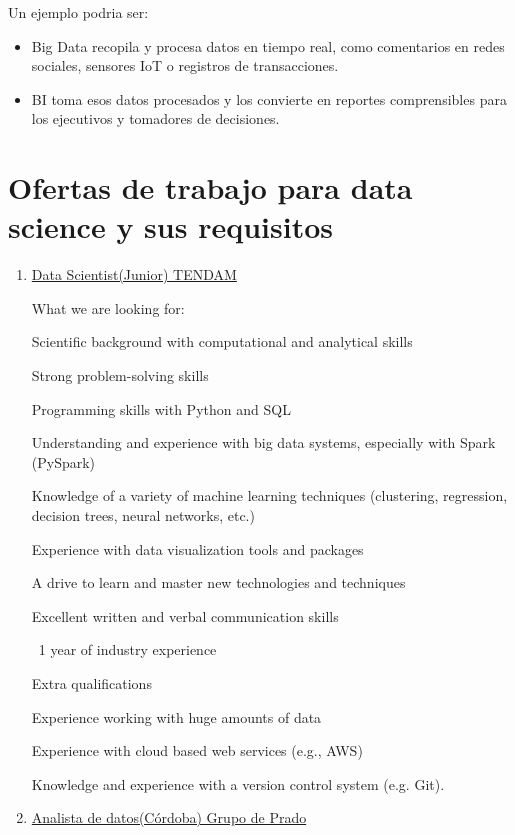 \documentclass[12pt]{article}
\begin{document}
Un ejemplo podria ser:

\begin{itemize}
    \item Big Data recopila y procesa datos en tiempo real, como comentarios en redes sociales, 
    sensores IoT o registros de transacciones.
    \item BI toma esos datos procesados y los convierte en reportes comprensibles para los ejecutivos y tomadores de decisiones.
\end{itemize}

\section{Ofertas de trabajo para data science y sus requisitos}

\begin{enumerate}
    \item \href{https://www.linkedin.com/jobs/view/4160806767}{Data Scientist(Junior) TENDAM}

    What we are looking for:

    Scientific background with computational and analytical skills

    Strong problem-solving skills

    Programming skills with Python and SQL

    Understanding and experience with big data systems, especially with Spark (PySpark)

    Knowledge of a variety of machine learning techniques (clustering, regression, decision trees, neural networks, etc.)

    Experience with data visualization tools and packages

    A drive to learn and master new technologies and techniques

    Excellent written and verbal communication skills

    ~1 year of industry experience

    Extra qualifications

    Experience working with huge amounts of data

    Experience with cloud based web services (e.g., AWS)

    Knowledge and experience with a version control system (e.g. Git).

    \item \href{https://www.linkedin.com/jobs/view/4150478232}{Analista de datos(Córdoba) Grupo de Prado}
    

\end{enumerate}
\end{document}
